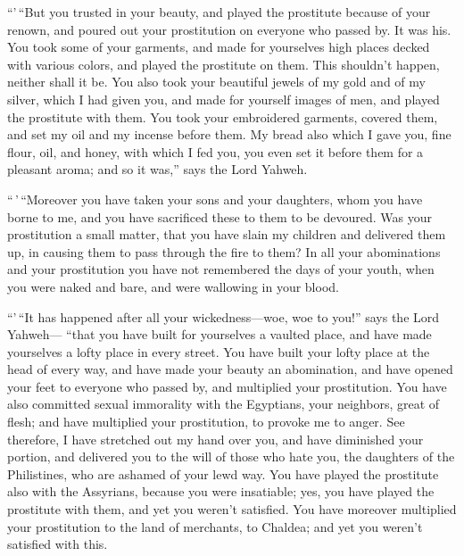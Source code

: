  ``'\,``But you trusted in your beauty, and played the
prostitute because of your renown, and poured out your prostitution on
everyone who passed by. It was his.  You took some of
your garments, and made for yourselves high places decked with various
colors, and played the prostitute on them. This shouldn't happen,
neither shall it be.  You also took your beautiful jewels
of my gold and of my silver, which I had given you, and made for
yourself images of men, and played the prostitute with them.
 You took your embroidered garments, covered them, and
set my oil and my incense before them.  My bread also
which I gave you, fine flour, oil, and honey, with which I fed you, you
even set it before them for a pleasant aroma; and so it was,'' says the
Lord Yahweh.

 ``\,'\,``Moreover you have taken your sons and your
daughters, whom you have borne to me, and you have sacrificed these to
them to be devoured. Was your prostitution a small matter,
 that you have slain my children and delivered them up,
in causing them to pass through the fire to them?  In all
your abominations and your prostitution you have not remembered the days
of your youth, when you were naked and bare, and were wallowing in your
blood.

 ``'\,``It has happened after all your wickedness---woe,
woe to you!'' says the Lord Yahweh---  ``that you have
built for yourselves a vaulted place, and have made yourselves a lofty
place in every street.  You have built your lofty place
at the head of every way, and have made your beauty an abomination, and
have opened your feet to everyone who passed by, and multiplied your
prostitution.  You have also committed sexual immorality
with the Egyptians, your neighbors, great of flesh; and have multiplied
your prostitution, to provoke me to anger.  See
therefore, I have stretched out my hand over you, and have diminished
your portion, and delivered you to the will of those who hate you, the
daughters of the Philistines, who are ashamed of your lewd way.
 You have played the prostitute also with the Assyrians,
because you were insatiable; yes, you have played the prostitute with
them, and yet you weren't satisfied.  You have moreover
multiplied your prostitution to the land of merchants, to Chaldea; and
yet you weren't satisfied with this.

